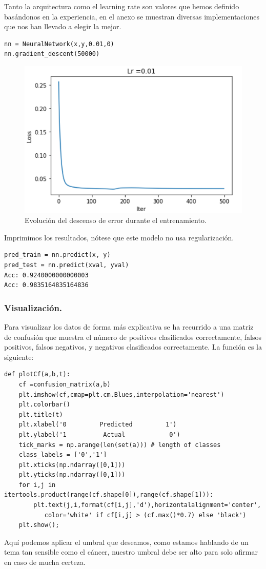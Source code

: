 \documentclass[a4paper,11pt]{article}
\begin{document}
\noindent
Tanto la arquitectura como el learning rate son valores que hemos definido basándonos en la experiencia, en el anexo se muestran diversas implementaciones que nos han llevado a elegir la mejor.
\begin{lstlisting}
nn = NeuralNetwork(x,y,0.01,0)
nn.gradient_descent(50000)
\end{lstlisting}
\begin{figure}[H]
\centering
\includegraphics[scale=0.6]{Annotation 2020-03-23 190119.png}
\caption{Evolución del descenso de error durante el entrenamiento.}
\end{figure}
\noindent
Imprimimos los resultados, nótese que este modelo no usa regularización.
\begin{lstlisting}
pred_train = nn.predict(x, y)
pred_test = nn.predict(xval, yval)
Acc: 0.9240000000000003
Acc: 0.9835164835164836
\end{lstlisting}


\subsubsection{Visualización.}
Para visualizar los datos de forma más explicativa se ha recurrido a una matriz de confusión que muestra el número de positivos clasificados correctamente, falsos positivos, falsos negativos, y  negativos clasificados correctamente. La función es la siguiente:
\begin{lstlisting}
def plotCf(a,b,t):
    cf =confusion_matrix(a,b)
    plt.imshow(cf,cmap=plt.cm.Blues,interpolation='nearest')
    plt.colorbar()
    plt.title(t)
    plt.xlabel('0         Predicted         1')
    plt.ylabel('1          Actual            0')
    tick_marks = np.arange(len(set(a))) # length of classes
    class_labels = ['0','1']
    plt.xticks(np.ndarray([0,1]))
    plt.yticks(np.ndarray([0,1]))
    for i,j in itertools.product(range(cf.shape[0]),range(cf.shape[1])):
        plt.text(j,i,format(cf[i,j],'d'),horizontalalignment='center',
           color='white' if cf[i,j] > (cf.max()*0.7) else 'black')
    plt.show();
\end{lstlisting}
Aquí podemos aplicar el umbral que deseamos, como estamos hablando de un tema tan sensible como el cáncer, nuestro umbral debe ser alto para solo afirmar en caso de mucha certeza.
\end{document}
